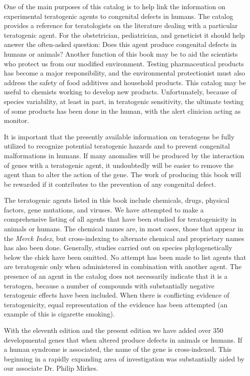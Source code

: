 One of the main purposes of this catalog is to help link the information on
experimental teratogenic agents to congenital defects in humans.
The catalog provides a reference for
teratologists on the literature dealing with a
particular teratogenic agent. For the obstetrician, pediatrician, and
geneticist it should help answer the often-asked question: Does this
agent produce congenital defects in humans or animals? Another
function of this book may be to aid the scientists who protect us
from our modified environment. Testing pharmaceutical products has
become a major responsibility, and the environmental protectionist
must also address the safety of food additives and household products.
This catalog may be useful to chemists working to develop new
products. Unfortunately, because of species variability, at least in
part, in teratogenic sensitivity, the ultimate testing of some
products has been done in the human, with the alert clinician acting
as monitor.

It is important that the presently available information on
teratogens be fully utilized to recognize potential teratogenic
hazards and to prevent congenital malformations in humans. If
many anomalies will be produced by the interaction of genes
with a teratogenic agent, it undoubtedly will be easier to remove the
agent than to alter the action of the gene. The work of producing
this book will be rewarded if it contributes to the prevention of any
congenital defect.

The teratogenic agents listed in this book include chemicals, drugs,
physical factors, gene mutations, and viruses.  We have attempted to
make a comprehensive listing of all agents that have been studied for
teratogenicity in animals or humans. The chemical names are, in most
cases, those that appear in the {\it Merck Index}, but cross-indexing
to alternate chemical and proprietary names has also been done.
Generally, studies carried out on species phylogenetically below the chick have
been omitted. No attempt has been made to list agents that are
teratogenic only when administered in combination with another agent.
The presence of an agent in the catalog does not necessarily indicate
that it is a teratogen, because a number of compounds with
substantially negative teratogenic effects have been included.  When
there is conflicting evidence of teratogenicity, equal representation
of the evidence has been attempted
(an example of this is cigarette smoking).

With the eleventh edition and the present edition we have added over
350 developmental
genes that when altered produce defects in animals or humans.  If a
human syndrome is associated, the name of the gene is cross-indexed.  This
beginning in a rapidly expanding area of investigation was
substantially aided by our associate Dr. Philip Mirkes.

